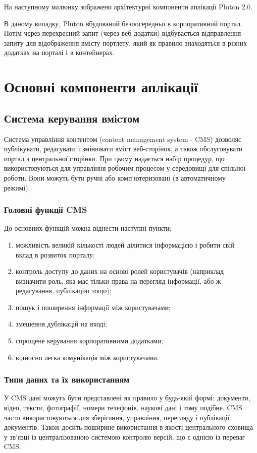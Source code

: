На наступному малюнку зображено архітектурні компоненти аплікації Pluton 2.0. 
\par В даному випадку, Pluton вбудований безпосередньо в корпоративний портал. 
Потім через перехресний запит (через веб-додатки) відбувається відправлення запиту для відображення вмісту портлету, який як правило знаходяться в різних додатках на порталі і в контейнерах. 

\section{Основні компоненти аплікації}



\subsection{Система керування вміcтом}
Система управління контентом (content management system - CMS) дозволяє публікувати, редагувати і змінювати вміст веб-сторінок, а також обслуговувати портал з центральної сторінки. 
При цьому надається набір процедур, що використовуються для управління робочим процесом у середовищі для спільної роботи.
Вони можуть бути ручні або комп'ютеризовані (в автоматичному режимі).
\subsubsection{Головні функції CMS}
До основних функцій можна віднести наступні пункти:
\begin{enumerate}
\item можливість великій кількості людей ділитися інформацією і робити свій вклад в розвиток порталу;
\item контроль доступу до даних на основі ролей користувачів (наприклад визначити роль, яка має тільки права на перегляд інформації, або ж редагування, публікацію тощо);
\item пошук і поширення інформації між користувачами;
\item змешення дублікацій на вході;
\item спрощене керування корпоративними додатками;
\item відносно легка комунікація між користувачами.
\end{enumerate}

\subsubsection{Типи даних та їх використанням}
У CMS дані можуть бути представлені як правило у будь-якій формі: документи, відео, тексти, фотографії, номери телефонів, наукові дані і тому подібне. 
CMS часто використовуються для зберігання, управління, перегляду і публікації документів. 
Також досить поширине використання в якості центрального сховища у зв'язці із централізованою системою контролю версій, що є однією із переваг CMS.
